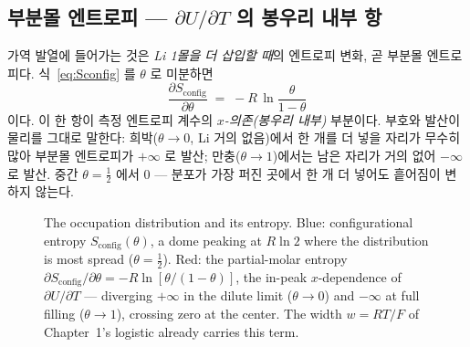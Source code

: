 \documentclass[11pt,a4paper]{article}
\newcommand{\config}{\mathrm{config}}
\begin{document}
\subsection{부분몰 엔트로피 — $\partial U/\partial T$ 의 봉우리 내부 항}
가역 발열에 들어가는 것은 \emph{Li 1몰을 더 삽입할 때}의 엔트로피 변화, 곧 부분몰 엔트로피다.
식~\eqref{eq:Sconfig} 를 $\theta$ 로 미분하면
\begin{equation}
\boxed{\;\frac{\partial S_\config}{\partial\theta}\;=\;-R\,\ln\frac{\theta}{1-\theta}\;}
\label{eq:partial_Sconfig}
\end{equation}
이다. 이 한 항이 측정 엔트로피 계수의 \emph{$x$-의존(봉우리 내부)} 부분이다. 부호와 발산이 물리를
그대로 말한다: 희박($\theta\to0$, Li 거의 없음)에서 한 개를 더 넣을 자리가 무수히 많아 부분몰
엔트로피가 $+\infty$ 로 발산; 만충($\theta\to1$)에서는 남은 자리가 거의 없어 $-\infty$ 로 발산.
중간 $\theta=\tfrac12$ 에서 $0$ — 분포가 가장 퍼진 곳에서 한 개 더 넣어도 흩어짐이 변하지 않는다.

\begin{figure}[t]
\centering
{}
\caption{The occupation distribution and its entropy. Blue: configurational entropy
$S_\mathrm{config}(\theta)$, a dome peaking at $R\ln2$ where the distribution is most spread
($\theta=\tfrac12$). Red: the partial-molar entropy $\partial S_\mathrm{config}/\partial\theta
=-R\ln[\theta/(1-\theta)]$, the in-peak $x$-dependence of $\partial U/\partial T$ — diverging
$+\infty$ in the dilute limit ($\theta\to0$) and $-\infty$ at full filling ($\theta\to1$),
crossing zero at the center. The width $w=RT/F$ of Chapter~1's logistic already carries this term.}
\label{fig:occ_entropy}
\end{figure}
\end{document}
